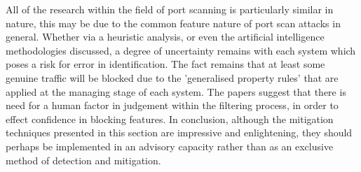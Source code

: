 All of the research within the field of port scanning is particularly similar in nature, this may be due to the common feature nature of port scan attacks in general. Whether via a heuristic analysis, or even the artificial intelligence methodologies discussed, a degree of uncertainty remains with each system which poses a risk for error in identification. The fact remains that at least some genuine traffic will be blocked due to the 'generalised property rules' that are applied at the managing stage of each system. The papers suggest that there is need for a human factor in judgement within the filtering process, in order to effect confidence in blocking features. In conclusion, although the mitigation techniques presented in this section are impressive and enlightening, they should perhaps be implemented in an advisory capacity rather than as an exclusive method of detection and mitigation.
